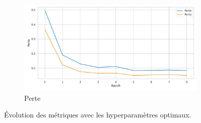 \begin{figure}[hbt]
\begin{subfigure}{.5\textwidth}
\begin{center}
        \end{center}
        \label{fig.results.tuned.training.bleu}
    \end{subfigure}
    \begin{subfigure}{.5\textwidth}
        \begin{center}
            \includegraphics[width=\textwidth]{assets/python/tuned-loss.pdf}
        \end{center}
        \caption{Perte}
        \label{fig.results.tuned.training.loss}
    \end{subfigure}
    \caption{Évolution des métriques avec les hyperparamètres optimaux.}
    \label{fig.results.tuned.training}
\end{figure}
